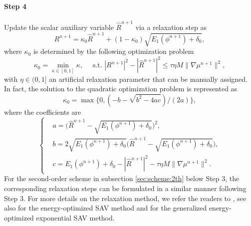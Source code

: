 \paragraph{\bf Step 4}
Update the scalar auxiliary variable $\widehat R^{n+1}$  via a relaxation step as
\begin{equation*}
	R^{n+1}=\kappa_0 \widehat{R}^{n+1}+\left(1-\kappa_0\right) \sqrt{E_1(\phi^{n+1})+\delta_0},
\end{equation*}
where $\kappa_0$ is determined by the following optimization problem
\begin{equation*} 
	\kappa_0=\min _{\kappa \in[0,1]} \kappa, \quad \text { s.t. } |R^{n+1}|^2  - |\widehat R^{n+1}|^2 \leq \tau \eta M\|\nabla \mu^{n+1}\|^2,
\end{equation*}
with $\eta \in (0,1]$ an artificial relaxation parameter that can be manually assigned.  In fact,
the solution to the quadratic optimization problem is represented as 
\begin{equation*} 
	\kappa_0=\max \big\{0, (-b-\sqrt{b^2-4 a c}) / (2 a)\big\},
\end{equation*}
where the coefficients are
\begin{equation*} 
	\left\{
	\begin{aligned}
		& a= \big(\widehat{R}^{n+1}-\sqrt{E_1(\phi^{n+1})+\delta_0}\big)^2, \\
		& b=  2\sqrt{E_1(\phi^{n+1})+\delta_0}\big(\widehat{R}^{n+1}-\sqrt{E_1(\phi^{n+1})+\delta_0}\big), \\
		& c=  E_1(\phi^{n+1})+\delta_0  - |\widehat{R}^{n+1} |^2  -\tau \eta M \|\nabla \mu^{n+1} \|^2.
	\end{aligned}
	\right.
\end{equation*}
For the second-order scheme  in subsection \ref{sec:scheme:2th} below Step 3,  the corresponding relaxation steps can be formulated in a similar manner following Step 3. For more details on the relaxation method, we refer the readers to \cite{jiang2022improving}, see also  \cite{liu2024novel}  for the energy-optimized SAV method and \cite{zhang2024novel} for the generalized energy-optimized exponential SAV method.   

